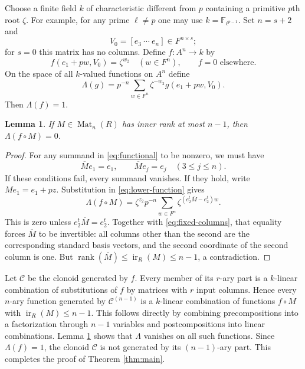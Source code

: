 \documentclass[11pt]{article}
\newtheorem{lemma}[theorem]{Lemma}
\theoremstyle{remark}\newtheorem{remark}[theorem]{Remark}
\newcommand{\F}{\mathbb F}
\newcommand{\Mat}{\operatorname{Mat}}
\newcommand{\rk}{\operatorname{rank}}
\newcommand{\ir}{\operatorname{ir}}
\begin{document}
Choose a finite field $k$ of characteristic different from $p$ containing a primitive $p$th root $\zeta$. For example, for any prime $\ell\ne p$ one may use $k=\F_{\ell^{p-1}}$. Set $n=s+2$ and
\[
 V_0=[e_3\ \cdots\ e_n]\in F^{n\times s};
\]
for $s=0$ this matrix has no columns. Define $f:A^n\to k$ by
\begin{equation}\label{eq:lower-function}
 f(e_1+pw,V_0)=\zeta^{w_2}\quad(w\in F^n),
 \qquad f=0\text{ elsewhere}.
\end{equation}
On the space of all $k$-valued functions on $A^n$ define
\begin{equation}\label{eq:functional}
 \Lambda(g)=p^{-n}\sum_{w\in F^n}
                \zeta^{-w_2}g(e_1+pw,V_0).
\end{equation}
Then $\Lambda(f)=1$.

\begin{lemma}\label{lem:lower}
If $M\in\Mat_n(R)$ has inner rank at most $n-1$, then
$\Lambda(f\circ M)=0$.
\end{lemma}
\begin{proof}
For any summand in \eqref{eq:functional} to be nonzero, we must have
\begin{equation}\label{eq:fixed-columns}
 \overline Me_1=e_1,\qquad
 \overline Me_j=e_j\quad(3\le j\le n).
\end{equation}
If these conditions fail, every summand vanishes. If they hold, write $Me_1=e_1+pz$. Substitution in \eqref{eq:lower-function} gives
\[
 \Lambda(f\circ M)=\zeta^{z_2}p^{-n}
       \sum_{w\in F^n}\zeta^{(e_2^t\overline M-e_2^t)w}.
\]
This is zero unless $e_2^t\overline M=e_2^t$. Together with \eqref{eq:fixed-columns}, that equality forces $\overline M$ to be invertible: all columns other than the second are the corresponding standard basis vectors, and the second coordinate of the second column is one. But $\rk(\overline M)\le\ir_R(M)\le n-1$, a contradiction.
\end{proof}

Let $\mathcal C$ be the clonoid generated by $f$. Every member of its $r$-ary part is a $k$-linear combination of substitutions of $f$ by matrices with $r$ input columns. Hence every $n$-ary function generated by $\mathcal C^{(n-1)}$ is a $k$-linear combination of functions $f\circ M$ with $\ir_R(M)\le n-1$. This follows directly by combining precompositions into a factorization through $n-1$ variables and postcompositions into linear combinations. Lemma \ref{lem:lower} shows that $\Lambda$ vanishes on all such functions. Since $\Lambda(f)=1$, the clonoid $\mathcal C$ is not generated by its $(n-1)$-ary part. This completes the proof of Theorem \ref{thm:main}.
\end{document}
